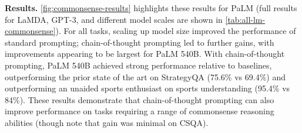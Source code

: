 \documentclass[]{article}
\theoremstyle{plain}
\theoremstyle{definition}
\theoremstyle{remark}
\newcommand{\lamda}[0]{LaMDA}
\newcommand{\palm}[0]{PaLM}
\begin{document}
\textbf{Results.}
\cref{fig:commonsense-results} highlights these results for \palm{} (full results for \lamda{}, GPT-3, and different model scales are shown in \cref{tab:all-lm-commonsense}).
For all tasks, scaling up model size improved the performance of standard prompting; chain-of-thought prompting led to further gains, with improvements appearing to be largest for \palm{} 540B.
With chain-of-thought prompting, \palm{} 540B achieved strong performance relative to baselines, outperforming the prior state of the art on StrategyQA (75.6\% vs 69.4\%) and outperforming an unaided sports enthusiast on sports understanding (95.4\% vs 84\%).
These results demonstrate that chain-of-thought prompting can also improve performance on tasks requiring a range of commonsense reasoning abilities (though note that gain was minimal on CSQA).
\end{document}
